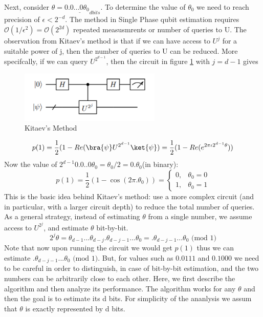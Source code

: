 \documentclass[12pt, oneside]{book}
\theoremstyle{definition}
\theoremstyle{definition}
\theoremstyle{remark}
\begin{document}
Next, consider $\theta=0.\underline{0...0\theta_0}_{d bits}$. To determine the value of $\theta_0$ we need to reach precision of 
$\epsilon<2^{-d}$. The method in Single Phase qubit estimation requires $\mathcal{O}(1/\epsilon^2)=\mathcal{O}(2^{2d})$
repeated measusmrents or number of queries to U. The observation from Kitaev's method is that if we can have access to $U^j$ for a suitable power of j, then the number of queries to U can be reduced.
More specifcally, if we can query $U^{2^{d-1}}$, then the circuit in figure 
\ref{fig:Kitaev} with $j=d-1$ gives
\begin{figure}[H]
    \centering
    \includegraphics[width=0.6\textwidth]{../images/phaseest5.png}
    \caption{Kitaev's Method}
    \label{fig:Kitaev}
\end{figure}
\[
p(1)=\frac{1}{2}(1-Re(\bra{\psi}U^{2^{d-1}}\ket{\psi})=\frac{1}{2}(1-Re(e^{2\pi\iota 2^{d-1}\theta}))
\]
Now the value of $2^{d-1}0.0..0\theta_0=\theta_0/2=0.\theta_0 $(in binary):
\[
p(1)=\frac{1}{2}(1-\cos (2\pi.\theta_0))=\begin{cases} 0, & \theta_0=0 \\ 1, & \theta_0=1 \end{cases}
\]
This is the basic idea behind Kitaev's method: use a more complex circuit (and in particular, with a larger circuit depth)
to reduce the total number of queries. As a general strategy, instead of estimating $\theta$ from a single number,
we assume access to $U^{2^j}$, and estimate $\theta$ bit-by-bit.
\[
    2^j\theta=\theta_{d-1}...\theta_{d-j}.\theta_{d-j-1}...\theta_0=.\theta_{d-j-1}...\theta_0 \text{ (mod 1)}
\]
Note that now upon running the circuit we would get $p(1)$ thus we can estimate $.\theta_{d-j-1}...\theta_0 \text{ (mod 1)}$.
But, for values such as $0.0111$ and $0.1000$ we need to be careful in order to distinguish,
in case of bit-by-bit estimation, and the two numbers can be arbitrarily close to each other.
Here, we first describe the algorithm and then analyze its performance. The algorithm works for any $\theta$ and then the goal 
is to estimate its d bits. For simplicity of the ananlysis we assum that $\theta$ is exactly represented by d bits.
\end{document}

